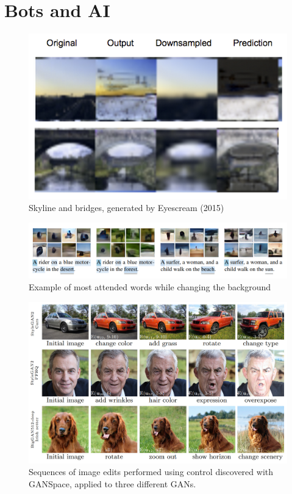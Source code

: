 \section{Bots and AI}

\begin{figure}
    \includegraphics[width=\linewidth]{05_GANs/eyescream_predicted16.png}
    \caption{Skyline and bridges, generated by Eyescream (2015)}
    \label{fig:eyescream}
\end{figure}

\begin{figure}
    \includegraphics[width=\linewidth]{05_GANs/gen_from_captions.png}
    \caption{Example of most attended words while changing the background}
    \label{fig:gen_attention}
\end{figure}

\begin{figure}
    \includegraphics[width=\linewidth]{05_GANs/ganspace.jpg}
    \caption{Sequences of image edits performed using control discovered with GANSpace, applied to three different GANs.}
    \label{fig:ganspace}
\end{figure}

